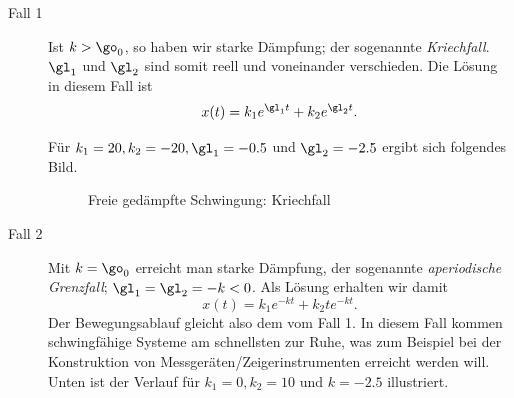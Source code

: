 \documentclass[%
11pt,%
twoside,%
titlepage,%
german,%
headsepline%
]{scrartcl}
\begin{document}
\begin{description}
\item[Fall 1] Ist $k>\go_0$, so haben wir starke D\"ampfung; der sogenannte \emph{Kriechfall}. $\gl_1$ und $\gl_2$ sind somit reell und voneinander verschieden. Die L\"osung in diesem Fall ist
$$x(t)=k_1e^{\gl_1 t}+k_2e^{\gl_2 t}.$$

F\"ur $k_1=20, k_2=-20,\gl_1=-0.5$ und $\gl_2=-2.5$ ergibt sich folgendes Bild.

\begin{figure}
\begin{center}
\end{center}
\caption{Freie ged\"ampfte Schwingung: Kriech\-fall}
\end{figure}

\item[Fall 2] Mit $k=\go_0$ erreicht man starke D\"ampfung,  der sogenannte \emph{aperiodische Grenzfall}; $\gl_1=\gl_2=-k<0$.
Als L\"osung erhalten wir damit
$$x(t)=k_1e^{-kt}+k_2te^{-kt}.$$
Der Bewegungsablauf gleicht also dem vom Fall 1. In diesem Fall kommen schwingf\"ahige Systeme am schnellsten zur Ruhe, was zum Beispiel bei der Konstruktion von Messger\"aten/Zeigerinstrumenten erreicht werden will. Unten ist der Verlauf f\"ur $k_1=0, k_2=10$ und $k=-2.5$ illustriert.


\end{description}
\end{document}
